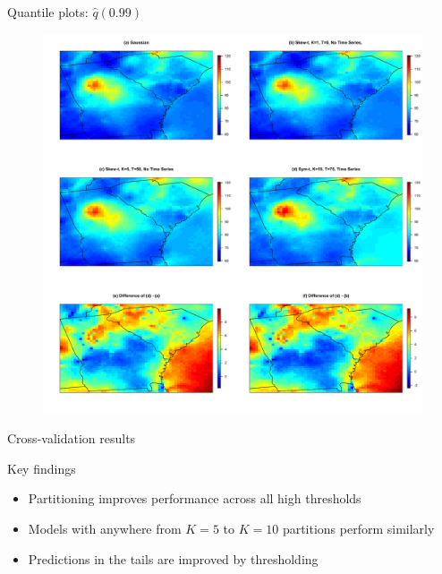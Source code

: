 \documentclass{beamer}
\begin{document}
\begin{frame}{Quantile plots: $\widehat{q}(0.99)$}
  \centering
  \begin{figure}
    \includegraphics[width=\linewidth, trim=0in 4in 0in 0in]{./plots/pot/q99-ozone.pdf}
  \end{figure}
\end{frame}

\begin{frame}{Cross-validation results}
\begin{adjustwidth}{1em}{0em}
  Key findings \vspace{1em}
  \begin{itemize} \setlength{\itemsep}{1em}
    \item Partitioning improves performance across all high thresholds
    \item Models with anywhere from $K = 5$ to $K = 10$ partitions perform similarly
    \item Predictions in the tails are improved by thresholding
  \end{itemize}
\end{adjustwidth}
\end{frame}
\end{document}
